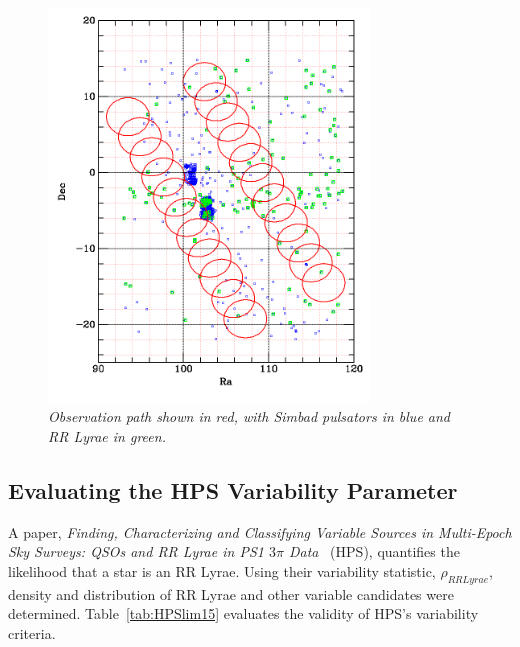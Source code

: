 \documentclass[aps,prb,twocolumn,superscriptaddress]{revtex4-1}
\begin{document}

\begin{figure}[H]
 \centering
 	\includegraphics[width=3.35in]{figures/simbadoverlap.png}
 \caption{\it \small{Observation path shown in red, with Simbad pulsators in blue and RR Lyrae in green.}}
 \label{fig:simoverlap}
\end{figure}



\subsection{Evaluating the HPS Variability Parameter}

A paper, \textit{Finding, Characterizing and Classifying Variable Sources in Multi-Epoch Sky Surveys: QSOs and RR Lyrae in PS1 $3\pi$ Data}~\cite{PSdata} (HPS), quantifies the likelihood that a star is an RR Lyrae.  Using their variability statistic, $\rho_{RRLyrae}$, density and distribution of RR Lyrae and other variable candidates were determined.  Table~\ref{tab:HPSlim15} evaluates the validity of HPS's variability criteria.
\end{document}
